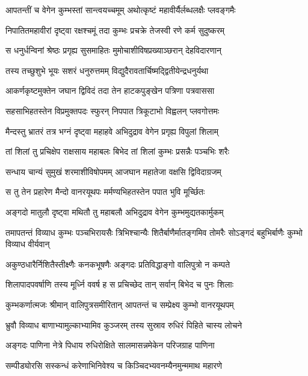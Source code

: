\twolineshloka
{आपतन्तीं च वेगेन कुम्भस्तां सान्त्वयच्चमूम्}
{अथोत्कृष्टं महावीर्यैर्लब्धलक्षैः प्लवङ्गमैः} %

\twolineshloka
{निपातितमहावीरां दृष्ट्वा रक्षश्चमूं तदा}
{कुम्भः प्रचक्रे तेजस्वी रणे कर्म सुदुष्करम्} %

\twolineshloka
{स धनुर्धन्विनां श्रेष्ठः प्रगृह्य सुसमाहितः}
{मुमोचाशीविषप्रख्याञ्छरान् देहविदारणान्} %

\twolineshloka
{तस्य तच्छुशुभे भूयः सशरं धनुरुत्तमम्}
{विद्युदैरावतार्चिष्मद्द्वितीयेन्द्रधनुर्यथा} %

\twolineshloka
{आकर्णकृष्टमुक्तेन जघान द्विविदं तदा}
{तेन हाटकपुङ्खेन पत्रिणा पत्रवाससा} %

\twolineshloka
{सहसाभिहतस्तेन विप्रमुक्तपदः स्फुरन्}
{निपपात त्रिकूटाभो विह्वलन् प्लवगोत्तमः} %

\twolineshloka
{मैन्दस्तु भ्रातरं तत्र भग्नं दृष्ट्वा महाहवे}
{अभिदुद्राव वेगेन प्रगृह्य विपुलां शिलाम्} %

\twolineshloka
{तां शिलां तु प्रचिक्षेप राक्षसाय महाबलः}
{बिभेद तां शिलां कुम्भः प्रसन्नैः पञ्चभिः शरैः} %

\twolineshloka
{सन्धाय चान्यं सुमुखं शरमाशीविषोपमम्}
{आजघान महातेजा वक्षसि द्विविदाग्रजम्} %

\twolineshloka
{स तु तेन प्रहारेण मैन्दो वानरयूथपः}
{मर्मण्यभिहतस्तेन पपात भुवि मूर्च्छितः} %

\twolineshloka
{अङ्गदो मातुलौ दृष्ट्वा मथितौ तु महाबलौ}
{अभिदुद्राव वेगेन कुम्भमुद्यतकार्मुकम्} %

\threelineshloka
{तमापतन्तं विव्याध कुम्भः पञ्चभिरायसैः}
{त्रिभिश्चान्यैः शितैर्बाणैर्मातङ्गमिव तोमरैः}
{सोऽङ्गदं बहुभिर्बाणैः कुम्भो विव्याध वीर्यवान्} %

\twolineshloka
{अकुण्ठधारैर्निशितैस्तीक्ष्णैः कनकभूषणैः}
{अङ्गदः प्रतिविद्धाङ्गो वालिपुत्रो न कम्पते} %

\twolineshloka
{शिलापादपवर्षाणि तस्य मूर्ध्नि ववर्ष ह}
{स प्रचिच्छेद तान् सर्वान् बिभेद च पुनः शिलाः} %

\twolineshloka
{कुम्भकर्णात्मजः श्रीमान् वालिपुत्रसमीरितान्}
{आपतन्तं च सम्प्रेक्ष्य कुम्भो वानरयूथपम्} %

\twolineshloka
{भ्रुवौ विव्याध बाणाभ्यामुल्काभ्यामिव कुञ्जरम्}
{तस्य सुस्राव रुधिरं पिहिते चास्य लोचने} %

\twolineshloka
{अङ्गदः पाणिना नेत्रे पिधाय रुधिरोक्षिते}
{सालमासन्नमेकेन परिजग्राह पाणिना} %

\twolineshloka
{सम्पीड्योरसि सस्कन्धं करेणाभिनिवेश्य च}
{किञ्चिदभ्यवनम्यैनमुन्ममाथ महारणे} %

